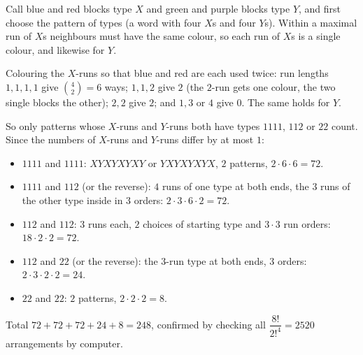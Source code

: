 Call blue and red blocks type $X$ and green and purple blocks type $Y$, and first choose the pattern of types (a word with four $X$s and four $Y$s). Within a maximal run of $X$s neighbours must have the same colour, so each run of $X$s is a single colour, and likewise for $Y$.

Colouring the $X$-runs so that blue and red are each used twice: run lengths $1,1,1,1$ give $\binom42=6$ ways; $1,1,2$ give $2$ (the $2$-run gets one colour, the two single blocks the other); $2,2$ give $2$; and $1,3$ or $4$ give $0$. The same holds for $Y$.

So only patterns whose $X$-runs and $Y$-runs both have types $1111$, $112$ or $22$ count. Since the numbers of $X$-runs and $Y$-runs differ by at most $1$:
\begin{itemize}
\item $1111$ and $1111$: $XYXYXYXY$ or $YXYXYXYX$, $2$ patterns, $2\cdot6\cdot6=72$.
\item $1111$ and $112$ (or the reverse): $4$ runs of one type at both ends, the $3$ runs of the other type inside in $3$ orders: $2\cdot3\cdot6\cdot2=72$.
\item $112$ and $112$: $3$ runs each, $2$ choices of starting type and $3\cdot3$ run orders: $18\cdot2\cdot2=72$.
\item $112$ and $22$ (or the reverse): the $3$-run type at both ends, $3$ orders: $2\cdot3\cdot2\cdot2=24$.
\item $22$ and $22$: $2$ patterns, $2\cdot2\cdot2=8$.
\end{itemize}
Total $72+72+72+24+8=\boxed{248}$, confirmed by checking all $\dfrac{8!}{2!^4}=2520$ arrangements by computer.
